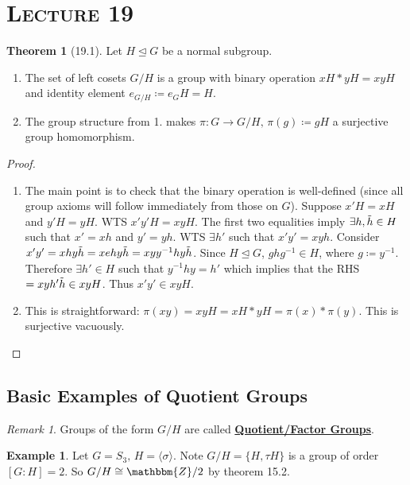 \documentclass{article}
\newcommand{\Z}{\mathbbm{Z}}
\newcommand{\coleq}{\coloneqq}
\newcommand{\inverse}[1]{#1^{-1}}
\newcommand{\define}[1]{\textbf{\underline{#1}}}
\newcommand{\func}[3]{#1: #2 \to #3}
\theoremstyle{definition}
\newtheorem*{thm}{Theorem}
\newtheorem*{ex}{Example}
\theoremstyle{remark}
\newtheorem*{rmk}{Remark}
\newcommand{\cyc}[1]{\langle#1\rangle}
\newcommand{\normal}{\unlhd}
\newcommand{\iso}{\cong}
\begin{document}
    \section*{\textbf{\textsc{Lecture 19}}}{
        \begin{thm}[19.1]
            Let $H\normal G$ be a normal subgroup.
            \begin{enumerate}
                \item The set of left cosets $G/H$ is a group with binary operation $xH*yH=xyH$ and identity element $e_{G/H}\coleq e_GH=H$.
                \item The group structure from 1. makes $\func{\pi}{G}{G/H}, \, \pi(g)\coleq gH$ a surjective group homomorphism.
            \end{enumerate}
        \end{thm}
        
        \begin{proof}
            \noindent\begin{enumerate}
                \item The main point is to check that the binary operation is well-defined (since all group axioms will follow immediately from those on $G$). Suppose $x'H=xH$ and $y'H=yH$. WTS $x'y'H=xyH$. The first two equalities imply $\exists h,\Tilde{h}\in H$ such that $x'=xh$ and $y'=yh$. WTS $\exists h'$ such that $x'y'=xyh$. Consider $x'y'=xhy\Tilde{h}=xehy\Tilde{h}=xy\inverse{y}hy\Tilde{h}$. Since $H \normal G$, $gh\inverse{g}\in H$, where $g \coleq \inverse{y}$. Therefore $\exists h' \in H$ such that $\inverse{y}hy=h'$ which implies that the RHS$=xyh'\Tilde{h}\in xyH$. Thus $x'y'\in xyH$.
                \item This is straightforward: $\pi(xy)=xyH=xH*yH=\pi(x)*\pi(y)$. This is surjective vacuously.
            \end{enumerate}
        \end{proof}
        
        \subsection*{Basic Examples of Quotient Groups}{
            \begin{rmk}
                Groups of the form $G/H$ are called \define{Quotient/Factor Groups}.
            \end{rmk}
                
            \begin{ex}
                Let $G=S_3, \, H=\cyc{\sigma}$. Note $G/H=\{H,\tau H\}$ is a group of order $[G:H]=2$. So $G/H\iso \Z/2$ by theorem 15.2.
            \end{ex}
                
}}
\end{document}
